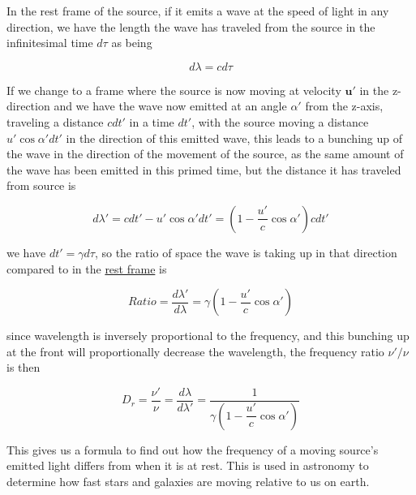 In the rest frame of the source, if it emits a wave at the speed of light in any direction, we have the length the wave has traveled from the source in the infinitesimal time ${d\tau}$ as being

\begin{equation}
	{d\lambda} = {c}{d\tau}
\end{equation}

If we change to a frame where the source is now moving at velocity ${\mathbf{u}{'}}$ in the z-direction and we have the wave now emitted at an angle $\alpha{'}$ from the z-axis, traveling a distance ${c}{dt{'}}$ in a time ${dt{'}}$, with the source moving a distance $ u{'} \cos\alpha{'} {dt{'}}$ in the direction of this emitted wave, this leads to a bunching up of the wave in the direction of the movement of the source, as the same amount of the wave has been emitted in this primed time, but the distance it has traveled from source is

\begin{equation}
	{d\lambda{'}} = {c}{dt{'}}-{u}{'} \cos\alpha{'} {dt{'}} = (1-\frac{u{'}}{c}\cos\alpha{'})cdt{'}
\end{equation}

we have ${dt{'}} = {\gamma} {d\tau}$, so the ratio of space the wave is taking up in that direction compared to in the \hyperlink{def-proper-frame}{rest frame} is

\begin{equation}
	Ratio = \frac{d\lambda{'}}{d\lambda} = {\gamma} \left(1-\dfrac{u{'}}{c} \cos\alpha{'} \right)
\end{equation}

since wavelength is inversely proportional to the frequency, and this bunching up at the front will proportionally decrease the wavelength, the frequency ratio $\nu{'}/\nu$ is then

\begin{equation}
	\label{eq: Doppler Effect}
	D_{r} = \frac{\nu{'}}{\nu} = \frac{d\lambda}{d\lambda{'}} = \frac{1}{ {\gamma} \left(1-\dfrac{u{'}}{c} \cos\alpha{'} \right)}
\end{equation}

This gives us a formula to find out how the frequency of a moving source's emitted light differs from when it is at rest.
This is used in astronomy to determine how fast stars and galaxies are moving relative to us on earth.


